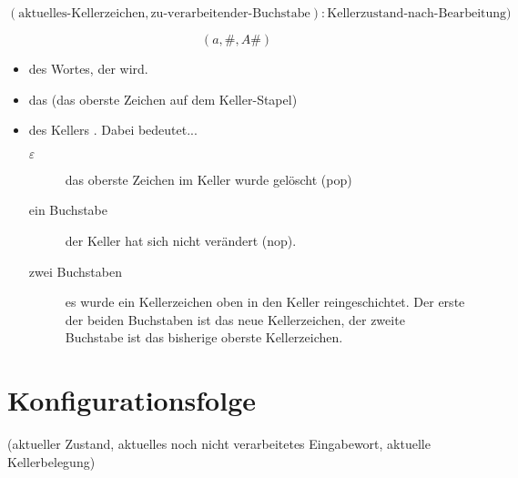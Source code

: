\documentclass{bschlangaul-theorie}
\begin{document}
\begin{displaymath}
(
\text{aktuelles-Kellerzeichen},
\text{zu-verarbeitender-Buchstabe}):
\text{Kellerzustand-nach-Bearbeitung})
\end{displaymath}

\begin{displaymath}
(a, \#, A\#)
\end{displaymath}

\begin{itemize}
\item

 des Wortes, der  wird.

\item

das  (\dh das oberste
Zeichen auf dem Keller-Stapel)

\item

 des Kellers . Dabei bedeutet...

\begin{description}
\item[$\varepsilon$]

das oberste Zeichen im Keller wurde gelöscht (\dh pop)

\item[ein Buchstabe]

der Keller hat sich nicht verändert (\dh nop).

\item[zwei Buchstaben]

es wurde ein Kellerzeichen oben in den Keller reingeschichtet. Der erste
der beiden Buchstaben ist das neue Kellerzeichen, der zweite Buchstabe
ist das bisherige oberste Kellerzeichen.
\end{description}
\end{itemize}

%

\section{Konfigurationsfolge}

\begin{center}
(aktueller Zustand, aktuelles noch nicht verarbeitetes Eingabewort, aktuelle Kellerbelegung)
\end{center}
\end{document}
